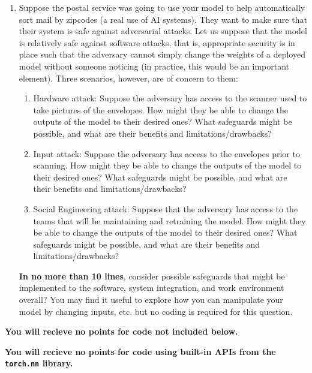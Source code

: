 \documentclass[submit]{harvardml}
\begin{document}
\begin{problem}
\begin{enumerate}
  \item Suppose the postal service was going to use your model to help automatically sort mail by zipcodes (a real use of AI systems).  They want to make sure that their system is safe against adversarial attacks.  Let us suppose that the model is relatively safe against software attacks, that is, appropriate security is in place such that the adversary cannot simply change the weights of a deployed model without someone noticing (in practice, this would be an important element).  Three scenarios, however, are of concern to them:
        \begin{enumerate}
          \item Hardware attack: Suppose the adversary has access to the
                scanner used to take pictures of the envelopes.  How might
                they be able to change the outputs of the model to their
                desired ones?  What safeguards might be possible, and what
                are their benefits and limitations/drawbacks?
          \item Input attack: Suppose the adversary has access to the
                envelopes prior to scanning.  How might they be able to
                change the outputs of the model to their desired ones?
                What safeguards might be possible, and what are their
                benefits and limitations/drawbacks?
          \item Social Engineering attack: Suppose that the adversary
                has access to the teams that will be maintaining and
                retraining the model.  How might they be able to change the
                outputs of the model to their desired ones?  What safeguards
                might be possible, and what are their benefits and
                limitations/drawbacks?
        \end{enumerate}
        \textbf{In no more than 10 lines}, consider possible safeguards that might be implemented to the software, system integration, and work environment overall?  You may find
        it useful to explore how you can manipulate your model by
        changing inputs, etc. but no coding is required for this
        question.

\end{enumerate}

{\bfseries You will recieve no points for code not included below.}

{\bfseries You will recieve no points for code using built-in APIs from the \verb|torch.nn| library.}

\end{problem}
\end{document}
